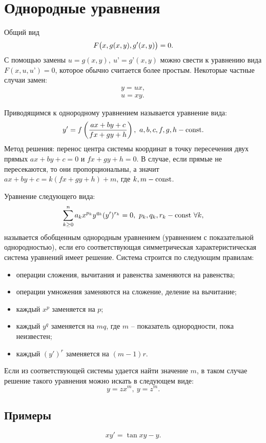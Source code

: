 \section{Однородные уравнения}

    Общий вид 
    \[
        F\bigl( x, g(x, y), g'(x, y) \bigr) = 0.
    \]
    С помощью замены $ u = g(x,y), ~ u’ = g’(x, y) $ можно свести к уравнению вида $ F(x, u, u’) = 0 $, которое обычно считается более простым. Некоторые частные случаи замен:
    \[
        \begin{split}
            y = ux, \\
            u = xy.
        \end{split}
    \]
    
    Приводящимся к однородному уравнением называется уравнение вида:
    \[
        y' = f\left( \dfrac{ax + by + c}{fx + gy + h} \right), ~ a, b, c, f, g, h - \mathrm{const}.
    \]
    Метод решения: перенос центра системы координат в точку пересечения двух прямых $ ax + by + c = 0 $ и $ fx + gy + h = 0 $. В случае, если прямые не пересекаются, то они пропорциональны, а значит $ ax + by + c = k(fx + gy + h) + m $, где $ k, m - \mathrm{const} $.


    Уравнение следующего вида:
    \[
        \sum_{k \geq 0}^n a_k x^{p_k} y^{q_k} (y')^{r_k} = 0, ~ p_k, q_k, r_k - \mathrm{const} ~ \forall k,
    \]
    называется обобщенным однородным уравнением (уравнением с показательной однородностью), если его соответствующая симметрическая характеристическая система уравнений имеет решение. Система строится по следующим правилам:
    \begin{itemize}
        \item операции сложения, вычитания и равенства заменяются на равенства;
        \item операции умножения заменяются на сложение, деление на вычитание;
        \item каждый $ x^p $ заменяется на $ p $;
        \item каждый $ y^q $ заменяется на $ mq $, где $ m $ -- показатель однородности, пока неизвестен;
        \item каждый $ (y')^r $ заменяется на $ (m - 1)r $.
    \end{itemize}
    Если из соответствующей системы удается найти значение $ m $, в таком случае решение такого уравнения можно искать в следующем виде:
    \[
        y= zx^m, ~ y = z^m.
    \]

    \subsection{Примеры}
        \[
            xy' = \tan{xy} - y.
        \]

